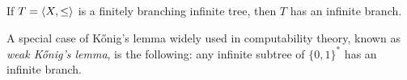 \documentclass[../../../include/open-logic-section]{subfiles}
\begin{document}
\begin{prop}
If $T = \langle X,\le \rangle$ is a finitely branching infinite tree,
then $T$ has an infinite branch.
\end{prop}

A special case of K\H{o}nig's lemma widely used in
computability theory, known as \emph{weak K\H{o}nig's lemma},
is the following:
any infinite subtree of $\{0,1\}^*$ has an infinite branch.
\end{document}
